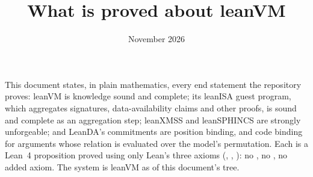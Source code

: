 \documentclass[11pt]{article}
\title{What is proved about leanVM}
\author{}
\date{November 2026}
\begin{document}
\maketitle

\noindent This document states, in plain mathematics, every end statement the repository proves:
leanVM is knowledge sound and complete; its leanISA guest program, which aggregates signatures,
data-availability claims and other proofs, is sound and complete as an aggregation step; leanXMSS
and leanSPHINCS are strongly unforgeable; and LeanDA's commitments are position binding, and code
binding for arguments whose relation is evaluated over the model's permutation. Each is a Lean~4
proposition proved using only Lean's three axioms (, ,
): no , no , no added axiom. The system is
leanVM as of this document's tree.
\end{document}
